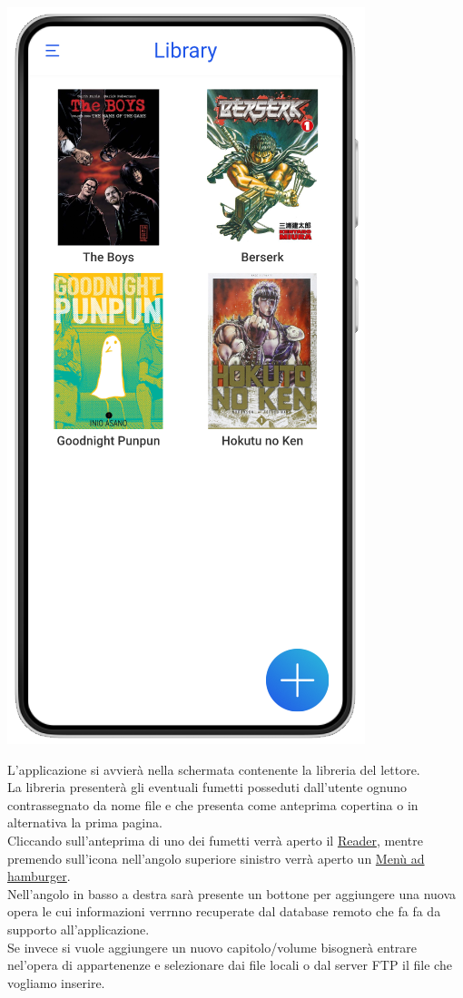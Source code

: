 \documentclass{report}
\begin{document}
\begin{center}
   \includegraphics[scale=0.4]{library_home_page.png}
\end{center}

L'applicazione si avvierà nella schermata contenente la libreria del lettore.\\
La libreria presenterà gli eventuali fumetti posseduti dall'utente ognuno contrassegnato da nome file e che presenta come anteprima copertina o in alternativa la prima pagina.\\
Cliccando sull'anteprima di uno dei fumetti verrà aperto il \hyperref[sec:reader]{Reader}, mentre premendo sull'icona nell'angolo superiore sinistro verrà aperto un \hyperref[sec:hamburger]{Menù ad hamburger}.\\
Nell'angolo in basso a destra sarà presente un bottone per aggiungere una nuova opera le cui informazioni verrnno recuperate dal database remoto che fa fa da supporto all'applicazione.\\
Se invece si vuole aggiungere un nuovo capitolo/volume bisognerà entrare nel'opera di appartenenze e selezionare dai file locali o dal server FTP il file che vogliamo inserire.
\end{document}
